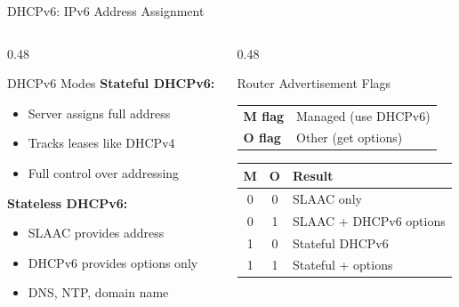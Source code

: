 \documentclass[aspectratio=169]{beamer}  %
\begin{document}
\begin{frame}{DHCPv6: IPv6 Address Assignment}
    \begin{columns}[T]
        \begin{column}{0.48\textwidth}
            \begin{block}{DHCPv6 Modes}
                \small
                \textbf{Stateful DHCPv6:}
                \begin{itemize}\setlength{\itemsep}{1pt}
                    \item Server assigns full address
                    \item Tracks leases like DHCPv4
                    \item Full control over addressing
                \end{itemize}
                
                \vspace{0.2em}
                \textbf{Stateless DHCPv6:}
                \begin{itemize}\setlength{\itemsep}{1pt}
                    \item SLAAC provides address
                    \item DHCPv6 provides options only
                    \item DNS, NTP, domain name
                \end{itemize}
            \end{block}
        \end{column}
        \begin{column}{0.48\textwidth}
            \begin{block}{Router Advertisement Flags}
                \small
                \begin{tabular}{l l}
                    \textbf{M flag} & Managed (use DHCPv6) \\
                    \textbf{O flag} & Other (get options) \\
                \end{tabular}
                
                \vspace{0.3em}
                \footnotesize
                \begin{tabular}{c c l}
                    \textbf{M} & \textbf{O} & \textbf{Result} \\
                    \hline
                    0 & 0 & SLAAC only \\
                    0 & 1 & SLAAC + DHCPv6 options \\
                    1 & 0 & Stateful DHCPv6 \\
                    1 & 1 & Stateful + options \\
                \end{tabular}
            \end{block}
            

\end{column}
\end{columns}
\end{frame}
\end{document}
